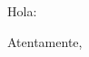 \documentclass[12pt,letterpaper]{letter}
\begin{document}
\signature{Juan Pedro Villa Isaza}

\address{}
\date{El Retiro, \today}

\begin{letter}{}

\opening{Hola:}

\lipsum[1-2]

\closing{Atentamente,}

\end{letter}
\end{document}
